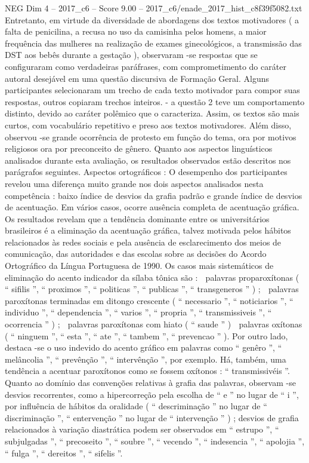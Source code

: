 \begin{textsample}{NEG Dim 4 – 2017\_c6 – Score 9.00 – 2017\_c6/enade\_2017\_hist\_c8f39f5082.txt}
Entretanto, em virtude da diversidade de abordagens dos textos motivadores ( a falta de penicilina, a recusa no uso da camisinha pelos homens, a maior frequência das mulheres na realização de exames ginecológicos, a transmissão das DST aos bebês durante a gestação ), observaram -se respostas que se configuraram como verdadeiras paráfrases, com comprometimento do caráter autoral desejável em uma questão discursiva de Formação Geral.
Alguns participantes selecionaram um trecho de cada texto motivador para compor suas respostas, outros copiaram trechos inteiros. - a questão 2 teve um comportamento distinto, devido ao caráter polêmico que o caracteriza.
Assim, os textos são mais curtos, com vocabulário repetitivo e preso aos textos motivadores.
Além disso, observou -se grande ocorrência de protesto em função do tema, ora por motivos religiosos ora por preconceito de gênero.
Quanto aos aspectos linguísticos analisados durante esta avaliação, os resultados observados estão descritos nos parágrafos seguintes.
Aspectos ortográficos : O desempenho dos participantes revelou uma diferença muito grande nos dois aspectos analisados nesta competência : baixo índice de desvios da grafia padrão e grande índice de desvios de acentuação.
Em vários casos, ocorre ausência completa de acentuação gráfica.
Os resultados revelam que a tendência dominante entre os universitários brasileiros é a eliminação da acentuação gráfica, talvez motivada pelos hábitos relacionados às redes sociais e pela ausência de esclarecimento dos meios de comunicação, das autoridades e das escolas sobre as decisões do Acordo Ortográfico da Língua Portuguesa de 1990.
Os casos mais sistemáticos de eliminação do acento indicador da sílaba tônica são :  palavras proparoxítonas ( “ sifilis ”, “ proximos ”, “ politicas ”, “ publicas ”, “ transgeneros ” ) ;  palavras paroxítonas terminadas em ditongo crescente ( “ necessario ”, “ noticiarios ”, “ individuo ”, “ dependencia ”, “ varios ”, “ propria ”, “ transmissiveis ”, “ ocorrencia ” ) ;  palavras paroxítonas com hiato ( “ saude ” )  palavras oxítonas ( “ ninguem ”, “ esta ”, “ ate ”, “ tambem ”, “ prevencao ” ).
Por outro lado, destaca -se o uso indevido do acento gráfico em palavras como “ genêro ”, “ melâncolia ”, “ prevênção ”, “ intervênção ”, por exemplo.
Há, também, uma tendência a acentuar paroxítonos como se fossem oxítonos : “ transmissivéis ”.
Quanto ao domínio das convenções relativas à grafia das palavras, observam -se desvios recorrentes, como a hipercorreção pela escolha de “ e ” no lugar de “ i ”, por influência de hábitos da oralidade ( “ descriminação ” no lugar de “ discriminação ”, “ entervenção ” no lugar de “ intervenção ” ) ; desvios de grafia relacionados à variação diastrática podem ser observados em “ estrupo ”, “ subjulgadas ”, “ precoseito ”, “ soubre ”, “ vecendo ”, “ indesencia ”, “ apolojia ”, “ fulga ”, “ dereitos ”, “ sifelis ”.

\end{textsample}
